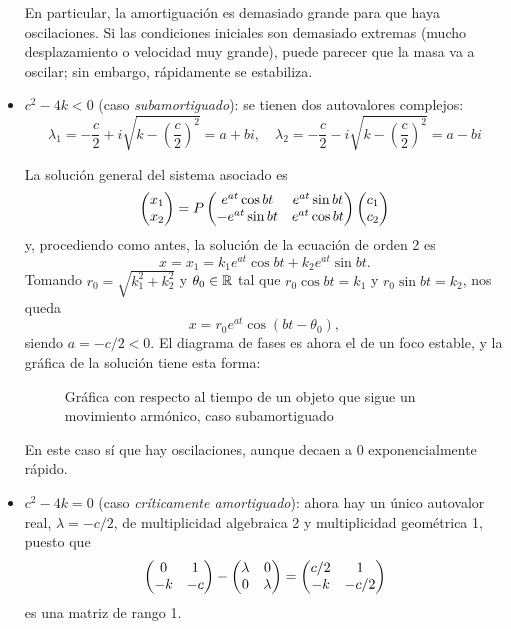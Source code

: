 \documentclass[../ecuaciones_diferenciales.tex]{subfiles}
\begin{document}
\begin{itemize}
	      En particular, la amortiguación es demasiado grande para que haya
	      oscilaciones. Si las condiciones iniciales son demasiado extremas (mucho
	      desplazamiento o velocidad muy grande), puede parecer que la masa va a
	      oscilar; sin embargo, rápidamente se estabiliza.
	\item \(c^2 - 4k < 0\) (caso \emph{subamortiguado}): se tienen dos autovalores
	      complejos:
	      \[\lambda_1 = -\frac{c}{2}+i\sqrt{k-\left(\frac{c}{2}\right)^2} = a + bi, \quad
		      \lambda_2 = -\frac{c}{2}-i\sqrt{k-\left(\frac{c}{2}\right)^2} = a - bi\]

	      La solución general del sistema asociado es
	      \[\begin{pmatrix}x_1 \\ x_2\end{pmatrix} = P \begin{pmatrix}e^{at} \cos bt & e^{at} \sin bt \\ -e^{at} \sin
		      bt & e^{at} \cos bt\end{pmatrix} \begin{pmatrix}c_1 \\ c_2\end{pmatrix}\]
	      y, procediendo como antes, la solución de la ecuación de orden 2 es
	      \[x = x_1 = k_1e^{at} \cos bt + k_2e^{at} \sin bt.\]
	      Tomando \(r_0 = \sqrt{k_1^2+k_2^2}\) y \(\theta_0 \in \mathbb{R}\) tal que \(r_0
	      \cos bt = k_1\) y \(r_0 \sin bt = k_2\), nos queda
	      \[x = r_0e^{at} \cos (bt - \theta_0),\]
	      siendo \(a = -c/2 < 0\). El diagrama de fases es ahora el de un foco
	      estable, y la gráfica de la solución tiene esta forma:
	      \begin{figure}[ht]
		      \centering
			\caption{Gráfica con respecto al tiempo de un objeto que
			  sigue un movimiento armónico, caso subamortiguado}
	      \end{figure}

	      En este caso sí que hay oscilaciones, aunque decaen a 0 exponencialmente rápido.

	\item \(c^2-4k=0\) (caso \emph{críticamente amortiguado}): ahora hay un único
	      autovalor real, \(\lambda = -c/2\), de multiplicidad algebraica 2 y
	      multiplicidad geométrica 1, puesto que
	      \[\begin{pmatrix}0 & 1 \\ -k & -c\end{pmatrix} - \begin{pmatrix}\lambda & 0 \\ 0 & \lambda\end{pmatrix} = \begin{pmatrix}c/2 & 1
			      \\ -k & -c/2\end{pmatrix}\]
	      es una matriz de rango 1.


\end{itemize}
\end{document}
